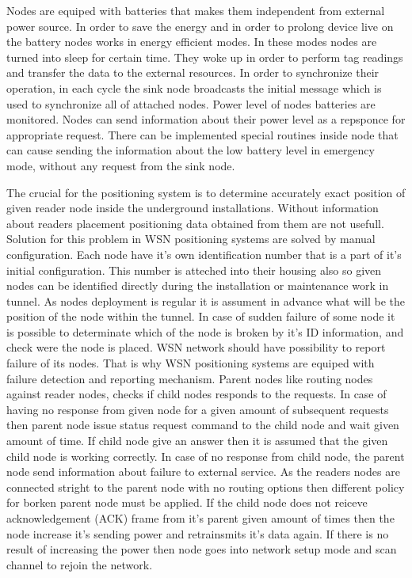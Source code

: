 \documentclass[../main.tex]{subfiles}
\begin{document}
Nodes are equiped with batteries that makes them independent from external power source. In order to save the energy and in order to prolong device live on the battery nodes works in energy efficient modes. In these modes nodes are turned into sleep for certain time. They woke up in order to perform tag readings and transfer the data to the external resources. In order to synchronize their operation, in each cycle the sink node broadcasts the initial message which is used to synchronize all of attached nodes. Power level of nodes batteries are monitored. Nodes can send information about their power level as a repsponce for appropriate request. There can be implemented special routines inside node that can cause sending the information about the low battery level in emergency mode, without any request from the sink node.

The crucial for the positioning system is to determine accurately exact position of given reader node inside the underground installations. Without information about readers placement positioning data obtained from them are not usefull. Solution for this problem in WSN positioning systems are solved by manual configuration. Each node have it's own identification number that is a part of it's initial configuration. This number is atteched into their housing also so given nodes can be identified directly during the installation or maintenance work in tunnel. As nodes deployment is regular it is assument in advance what will be the position of the node within the tunnel. In case of sudden failure of some node it is possible to determinate which of the node is broken by it's ID information, and check were the node is placed. WSN network should have possibility to report failure of its nodes. That is why WSN positioning systems are equiped with failure detection and reporting mechanism. Parent nodes like routing nodes against reader nodes, checks if child nodes responds to the requests. In case of having no response from given node for a given amount of subsequent requests then parent node issue status request command to the child node and wait given amount of time. If child node give an answer then it is assumed that the given child node is working correctly. In case of no response from child node, the parent node send information about failure to external service. As the readers nodes are connected stright to the parent node with no routing options then different policy for borken parent node must be applied. If the child node does not reiceve acknowledgement (ACK) frame from it's parent given amount of times then the node increase it's sending power and retrainsmits it's data again. If there is no result of increasing the power then node goes into network setup mode and scan channel to rejoin the network.
\end{document}
